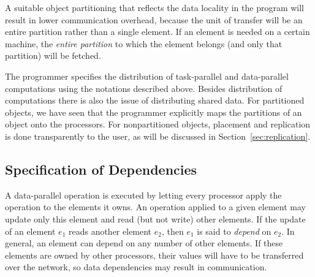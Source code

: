 \documentclass{acmtrans2e}
\begin{document}

A suitable object partitioning that reflects the data locality
in the program will result in lower communication overhead, because
the unit of transfer will be an entire partition rather than a single
element. If an element is needed on a certain machine, the
\emph{entire partition} to which the element belongs (and only that
partition) will be fetched.

The programmer specifies the distribution of task-parallel and data-parallel
computations using the notations described above.  Besides
distribution of computations there is also the issue of distributing
shared data. For partitioned objects, we have seen that the programmer
explicitly maps the partitions of an object onto the processors.
For nonpartitioned objects, placement and replication is
done transparently to the user, as will be discussed in
Section~\ref{sec:replication}.

\subsection{Specification of Dependencies}
\label{sec:depspec}

A data-parallel operation is executed by
letting every processor apply the operation to the elements it owns.
An operation applied to a given element may update only this element and
read (but not write) other elements.
If the update of an element $e_1$ reads another element $e_2$, 
then $e_1$ is said to \emph{depend} on $e_2$. In general, an element
can depend on any number of other elements.
If these elements are owned by other processors, their values will
have to be transferred over the network, so
data dependencies may result in communication.
\end{document}
